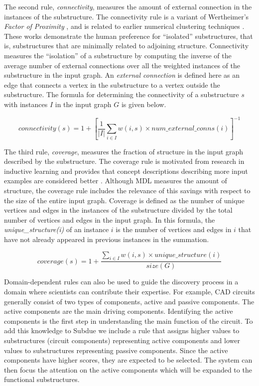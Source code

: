 The second rule, {\em connectivity}, measures the amount of external
connection in the instances of the substructure.  The connectivity
rule is a variant of Wertheimer's {\em Factor of Proximity}
\cite{wertheimer/laws}, and is related to earlier numerical
clustering techniques \cite{zahn/71}.  These works demonstrate the human
preference for ``isolated'' substructures, that is, substructures that are
minimally related to adjoining structure.  Connectivity measures the
``isolation'' of a substructure by computing the inverse of the average
number of external connections over all the weighted
instances of the substructure
in the input graph.  An {\em external connection} is defined here as an edge
that connects a vertex in the substructure to a vertex outside the substructure.
The formula for determining the
connectivity of a substructure $s$ with instances
$I$ in the input graph $G$ is given below.

\begin{equation}
connectivity(s) =
     1 + \left[ \frac{1}{\left| I \right|}
          \sum_{i \in I}^{}
           w(i,s) \times num\_external\_conns(i) \right]^{-1}
\end{equation}

The third rule, {\em coverage}, measures the fraction of structure in
the input graph described by the substructure.  The coverage rule is
motivated from research in inductive learning and provides that concept
descriptions describing more input examples are considered better
\cite{michalski/stepp/83}.  Although MDL measures the amount
of structure, the coverage rule includes the relevance of this
savings with respect to the size of the entire input graph.  Coverage is
defined as the number of unique vertices and edges in the instances of the
substructure divided by the total number of vertices and edges in the input
graph.  In this formula,
the {\em unique\_structure(i)} of an instance $i$ is the number of vertices and
edges in $i$ that have not already appeared in previous instances in the
summation.

\begin{equation}
coverage(s) = 1 + \frac{\sum_{i \in I}^{}
                          w(i,s) \times unique\_structure(i)}
                        {size(G)}
\end{equation}

Domain-dependent rules can also be used to guide the discovery process
in a domain where scientists can contribute their expertise.
For example, CAD circuits generally consist of two types of components,
active and passive components. The active components are the main driving
components. Identifying the active components is the first step in understanding
the main function of the circuit.  To add this knowledge to {\sc Subdue}
we include a rule that assigns higher values to substructures
(circuit components) representing active components and
lower values to substructures representing passive components.
Since the active components have higher scores, they are expected to be
selected. The system can then focus the attention on the active components
which will be expanded to the functional substructures.

